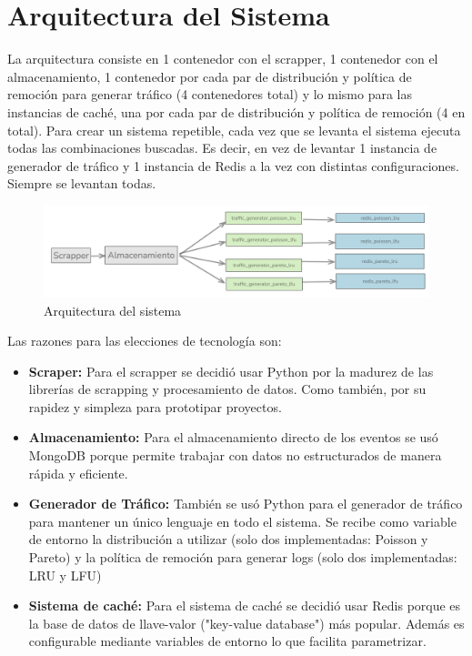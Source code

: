 \documentclass[12pt]{udpreport}
\begin{document}
\section{Arquitectura del Sistema}

La arquitectura consiste en 1 contenedor con el scrapper, 1 contenedor con el almacenamiento, 1 contenedor por cada par de distribución y política de remoción para generar tráfico (4 contenedores total) y lo mismo para las instancias de caché, una por cada par de distribución y política de remoción (4 en total).
\bigskip
Para crear un sistema repetible, cada vez que se levanta el sistema ejecuta todas las combinaciones buscadas. Es decir, en vez de levantar 1 instancia de generador de tráfico y 1 instancia de Redis a la vez con distintas configuraciones. Siempre se levantan todas.

\begin{figure}[h]
    \centering
    \includegraphics[width=12cm]{images/01-docker-compose.png}
    \caption{Arquitectura del sistema}
\end{figure}

Las razones para las elecciones de tecnología son:

\begin{itemize}
    \item \textbf{Scraper:} Para el scrapper se decidió usar Python por la madurez de las librerías de scrapping y procesamiento de datos. Como también, por su rapidez y simpleza para prototipar proyectos.
    \item \textbf{Almacenamiento: } Para el almacenamiento directo de los eventos se usó MongoDB porque permite trabajar con datos no estructurados de manera rápida y eficiente.
    \item \textbf{Generador de Tráfico: } También se usó Python para el generador de tráfico para mantener un único lenguaje en todo el sistema. Se recibe como variable de entorno la distribución a utilizar (solo dos implementadas: Poisson y Pareto) y la política de remoción para generar logs (solo dos implementadas: LRU y LFU)
    \item \textbf{Sistema de caché: } Para el sistema de caché se decidió usar Redis porque es la base de datos de llave-valor ("key-value database") más popular. Además es configurable mediante variables de entorno lo que facilita parametrizar.
\end{itemize}
\end{document}
